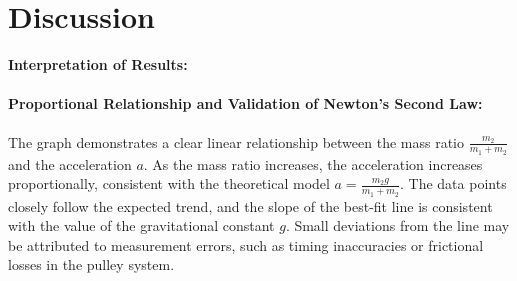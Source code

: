 ﻿\documentclass[reprint,amsmath,amssymb,aps]{revtex4-2}
\begin{document}
%
%
%
%








\section{Discussion}

\textbf{Interpretation of Results:}

\paragraph{Proportional Relationship and Validation of Newton's Second Law:}

The graph demonstrates a clear linear relationship between the mass ratio \( \frac{m_2}{m_1 + m_2} \) and the acceleration \( a \). As the mass ratio increases, the acceleration increases proportionally, consistent with the theoretical model \( a = \frac{m_2 g}{m_1 + m_2} \). The data points closely follow the expected trend, and the slope of the best-fit line is consistent with the value of the gravitational constant \( g \). Small deviations from the line may be attributed to measurement errors, such as timing inaccuracies or frictional losses in the pulley system. 
\end{document}
